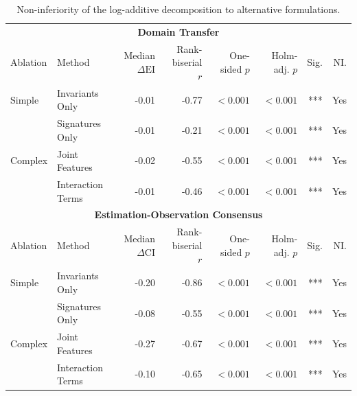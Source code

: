 \documentclass{article}
\begin{document}
\clearpage
\begin{table}[H]
\centering
\footnotesize
\captionsetup{position=top,skip=12pt}
\caption{Non-inferiority of the log-additive decomposition to alternative formulations.}
\label{tab:si-ablation}
\setlength{\tabcolsep}{2pt}
\begin{tabularx}{\linewidth}{@{}l>{\raggedright\arraybackslash}Xrrrrrr@{}}
\toprule
\multicolumn{8}{c}{\textbf{Domain Transfer}} \\
\cmidrule(lr){1-8}
Ablation & Method & \shortstack{Median\\$\Delta\mathrm{EI}$} & \shortstack{Rank-biserial\\$r$} & \shortstack{One-sided\\$p$} & \shortstack{Holm-adj.\\$p$} & Sig. & NI. \\
\midrule
Simple & Invariants Only & -0.01 & -0.77 & $<0.001$ & $<0.001$ & *** & Yes \\
 & Signatures Only & -0.01 & -0.21 & $<0.001$ & $<0.001$ & *** & Yes \\
\addlinespace
Complex & Joint Features & -0.02 & -0.55 & $<0.001$ & $<0.001$ & *** & Yes \\
 & Interaction Terms & -0.01 & -0.46 & $<0.001$ & $<0.001$ & *** & Yes \\
\midrule
\multicolumn{8}{c}{\textbf{Estimation-Observation Consensus}} \\
\cmidrule(lr){1-8}
Ablation & Method & \shortstack{Median\\$\Delta\mathrm{CI}$} & \shortstack{Rank-biserial\\$r$} & \shortstack{One-sided\\$p$} & \shortstack{Holm-adj.\\$p$} & Sig. & NI. \\
\midrule
Simple & Invariants Only & -0.20 & -0.86 & $<0.001$ & $<0.001$ & *** & Yes \\
 & Signatures Only & -0.08 & -0.55 & $<0.001$ & $<0.001$ & *** & Yes \\
\addlinespace
Complex & Joint Features & -0.27 & -0.67 & $<0.001$ & $<0.001$ & *** & Yes \\
 & Interaction Terms & -0.10 & -0.65 & $<0.001$ & $<0.001$ & *** & Yes \\
\bottomrule
\end{tabularx}
\par\vspace{12pt}
\begin{minipage}{\linewidth}
\footnotesize

\end{minipage}
\end{table}
\end{document}

